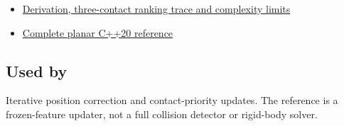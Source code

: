 \hypertarget{appendix-f682275acbdf-full-teaching-and-executable-evidence}{}

\begin{itemize}
\tightlist
\item
  \hyperref[06-engine-ii-ch046-refresh-neighboring-penetrations-after-position-correction]{Derivation, three-contact ranking trace and complexity limits}
\item
  \hyperref[06-engine-ii-ch046-a-planar-penetration-refresh-witness]{Complete planar C++20 reference}
\end{itemize}

\subsection{Used by}\label{appendix-f682275acbdf-used-by}

\hypertarget{appendix-f682275acbdf-used-by}{}

Iterative position correction and contact-priority updates. The reference is a frozen-feature updater, not a full collision detector or rigid-body solver.
